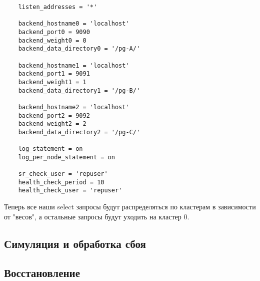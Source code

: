 \documentclass{article}
\begin{document}
\begin{verbatim}
    listen_addresses = '*'
    
    backend_hostname0 = 'localhost'
    backend_port0 = 9090
    backend_weight0 = 0
    backend_data_directory0 = '/pg-A/'

    backend_hostname1 = 'localhost'
    backend_port1 = 9091
    backend_weight1 = 1
    backend_data_directory1 = '/pg-B/'

    backend_hostname2 = 'localhost'
    backend_port2 = 9092
    backend_weight2 = 2
    backend_data_directory2 = '/pg-C/'

    log_statement = on
    log_per_node_statement = on

    sr_check_user = 'repuser'
    health_check_period = 10
    health_check_user = 'repuser'
\end{verbatim}

Теперь все наши select запросы будут распределяться по кластерам в зависимости от "весов", а остальные запросы будут уходить на кластер 0.

\subsection{Симуляция и обработка сбоя}

\subsection{Восстановление}
\end{document}
